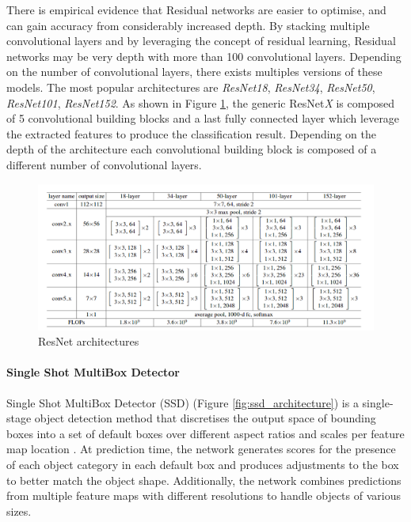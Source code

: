 There is empirical evidence that Residual networks are easier to optimise, and can gain accuracy from considerably increased depth. By stacking multiple convolutional layers and by leveraging the concept of residual learning, Residual networks may be very depth with more than 100 convolutional layers. Depending on the number of convolutional layers, there exists multiples versions of these models. The most popular architectures are \textit{ResNet18}, \textit{ResNet34}, \textit{ResNet50}, \textit{ResNet101}, \textit{ResNet152}. As shown in Figure \ref{fig:resnet_architectures}, the generic ResNet\textit{X} is composed of 5 convolutional building blocks and a last fully connected layer which leverage the extracted features to produce the classification result. Depending on the depth of the architecture each convolutional building block is composed of a different number of convolutional layers.

\begin{figure}
\centerline{\includegraphics[scale=0.4]{images/chapter_2/resnet.png}}
\caption{ResNet architectures \citep[from][]{he2016deep}}
\label{fig:resnet_architectures}
\end{figure}


\paragraph{Single Shot MultiBox Detector} \label{Single Shot MultiBox Detector}

Single Shot MultiBox Detector (SSD) (Figure \ref{fig:ssd_architecture}) is a single-stage object detection method that discretises the output space of bounding boxes into a set of default boxes over different aspect ratios and scales per feature map location \citep{liu2016ssd}. At prediction time, the network generates scores for the presence of each object category in each default box and produces adjustments to the box to better match the object shape. Additionally, the network combines predictions from multiple feature maps with different resolutions to handle objects of various sizes.

